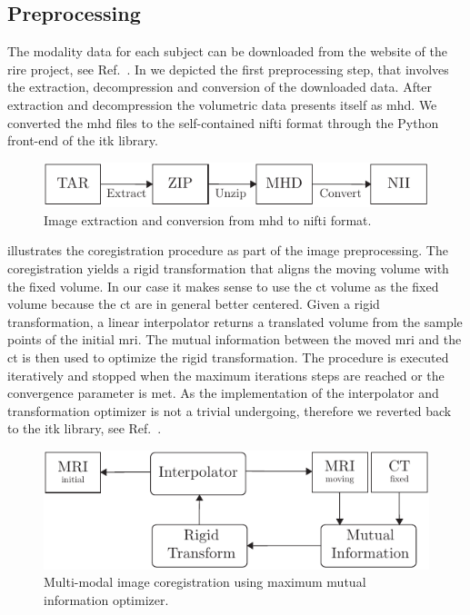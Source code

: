 \subsection{Preprocessing}

The modality data for each subject can be downloaded from the website of the
\gls{rire} project, see Ref.~\cite{RIRE}. In  we depicted
the first preprocessing step, that involves the extraction, decompression and
conversion of the downloaded data. After extraction and decompression the
volumetric data presents itself as \gls{mhd}. We converted the \gls{mhd} files
to the self-contained \gls{nifti} format through the Python front-end of the
\gls{itk} library.
\begin{figure}[h]
  \centering
  \includegraphics[width=\linewidth]{figure/conversion.pdf}
  \caption{Image extraction and conversion from \gls{mhd} to \gls{nifti}
		format.
	}\label{fig:conversion}
\end{figure}
 illustrates the coregistration procedure as part of
the image preprocessing. The coregistration yields a rigid transformation that
aligns the moving volume with the fixed volume. In our case it makes sense to
use the \gls{ct} volume as the fixed volume because the \gls{ct} are in
general better centered. Given a rigid transformation, a linear interpolator
returns a translated volume from the sample points of the initial \gls{mri}.
The mutual information between the moved \gls{mri} and the \gls{ct} is then
used to optimize the rigid transformation. The procedure is executed
iteratively and stopped when the maximum iterations steps are reached or
the convergence parameter is met. As the implementation of the interpolator
and transformation optimizer is not a trivial undergoing, therefore we
reverted back to the \gls{itk} library, see Ref.~\cite{Yaniv2018}.
\begin{figure}[h]
  \centering
  \includegraphics[width=\linewidth]{figure/registration.pdf}
  \caption{Multi-modal image coregistration using maximum mutual information
    optimizer.
	}\label{fig:registration}
\end{figure}
